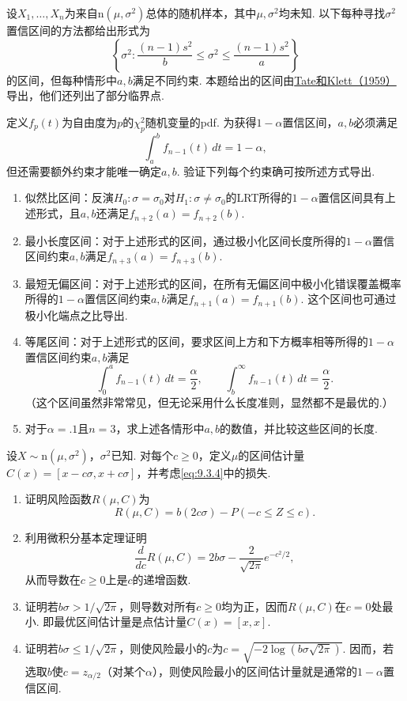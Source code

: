 \begin{exercise}\label{exercise:9.52}
设$X_1,\ldots,X_n$为来自$\mathrm n(\mu,\sigma^2)$总体的随机样本，其中$\mu,\sigma^2$均未知. 以下每种寻找$\sigma^2$置信区间的方法都给出形式为
$$\left\{\sigma^2:\frac{(n-1)s^2}b\le\sigma^2\le\frac{(n-1)s^2}a\right\}$$
的区间，但每种情形中$a,b$满足不同约束. 本题给出的区间由\hyperref[bib:source313]{Tate和Klett（1959）}导出，他们还列出了部分临界点.

定义$f_p(t)$为自由度为$p$的$\chi_p^2$随机变量的pdf. 为获得$1-\alpha$置信区间，$a,b$必须满足
$$\int_a^b f_{n-1}(t)\,dt=1-\alpha,$$
但还需要额外约束才能唯一确定$a,b$. 验证下列每个约束确可按所述方式导出.
\begin{enumerate}
\item 似然比区间：反演$H_0:\sigma=\sigma_0$对$H_1:\sigma\ne\sigma_0$的LRT所得的$1-\alpha$置信区间具有上述形式，且$a,b$还满足$f_{n+2}(a)=f_{n+2}(b)$.
\item 最小长度区间：对于上述形式的区间，通过极小化区间长度所得的$1-\alpha$置信区间约束$a,b$满足$f_{n+3}(a)=f_{n+3}(b)$.
\item 最短无偏区间：对于上述形式的区间，在所有无偏区间中极小化错误覆盖概率所得的$1-\alpha$置信区间约束$a,b$满足$f_{n+1}(a)=f_{n+1}(b)$. 这个区间也可通过极小化端点之比导出.
\item 等尾区间：对于上述形式的区间，要求区间上方和下方概率相等所得的$1-\alpha$置信区间约束$a,b$满足
$$\int_0^a f_{n-1}(t)\,dt=\frac\alpha2,\qquad\int_b^\infty f_{n-1}(t)\,dt=\frac\alpha2.$$
（这个区间虽然非常常见，但无论采用什么长度准则，显然都不是最优的.）
\item 对于$\alpha=.1$且$n=3$，求上述各情形中$a,b$的数值，并比较这些区间的长度.
\end{enumerate}
\end{exercise}
\begin{exercise}\label{exercise:9.53}
设$X\sim\mathrm n(\mu,\sigma^2)$，$\sigma^2$已知. 对每个$c\ge0$，定义$\mu$的区间估计量$C(x)=[x-c\sigma,x+c\sigma]$，并考虑\eqref{eq:9.3.4}中的损失.
\begin{enumerate}
\item 证明风险函数$R(\mu,C)$为
$$R(\mu,C)=b(2c\sigma)-P(-c\le Z\le c).$$
\item 利用微积分基本定理证明
$$\frac d{dc}R(\mu,C)=2b\sigma-\frac2{\sqrt{2\pi}}e^{-c^2/2},$$
从而导数在$c\ge0$上是$c$的递增函数.
\item 证明若$b\sigma>1/\sqrt{2\pi}$，则导数对所有$c\ge0$均为正，因而$R(\mu,C)$在$c=0$处最小. 即最优区间估计量是点估计量$C(x)=[x,x]$.
\item 证明若$b\sigma\le1/\sqrt{2\pi}$，则使风险最小的$c$为$c=\sqrt{-2\log(b\sigma\sqrt{2\pi})}$. 因而，若选取$b$使$c=z_{\alpha/2}$（对某个$\alpha$），则使风险最小的区间估计量就是通常的$1-\alpha$置信区间.
\end{enumerate}
\end{exercise}
